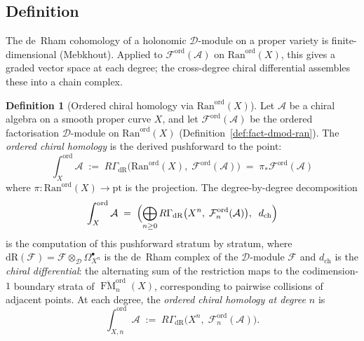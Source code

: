 \documentclass[11pt,reqno]{amsart}
\theoremstyle{definition}
\newtheorem{definition}[theorem]{Definition}
\theoremstyle{remark}
\newcommand{\cA}{\mathcal{A}}
\newcommand{\cD}{\mathcal{D}}
\newcommand{\cF}{\mathcal{F}}
\newcommand{\Ran}{\mathrm{Ran}}
\DeclareMathOperator{\FM}{FM}
\numberwithin{equation}{section}
\begin{document}
\subsection{Definition}
\label{subsec:ord-ch-def}

The de~Rham cohomology of a holonomic $\cD$-module on a
proper variety is finite-dimensional (Mebkhout).
Applied to $\cF^{\mathrm{ord}}(\cA)$ on
$\Ran^{\mathrm{ord}}(X)$, this gives a graded vector space
at each degree; the cross-degree chiral differential
assembles these into a chain complex.

\begin{definition}[Ordered chiral homology via
$\Ran^{\mathrm{ord}}(X)$]
\label{def:ord-ch-hom}
Let $\cA$ be a chiral algebra on a smooth proper curve $X$,
and let $\cF^{\mathrm{ord}}(\cA)$ be the ordered
factorisation $\cD$-module on $\Ran^{\mathrm{ord}}(X)$
(Definition~\ref{def:fact-dmod-ran}).
The \emph{ordered chiral homology} is the derived
pushforward to the point:
\begin{equation}\label{eq:ord-ch-hom-ran}
  \int_X^{\mathrm{ord}} \cA
  \;:=\;
  R\Gamma_{\mathrm{dR}}\bigl(
  \Ran^{\mathrm{ord}}(X),\;
  \cF^{\mathrm{ord}}(\cA)\bigr)
  \;=\;
  \pi_* \cF^{\mathrm{ord}}(\cA)
\end{equation}
where $\pi \colon \Ran^{\mathrm{ord}}(X) \to \mathrm{pt}$
is the projection. The degree-by-degree decomposition
\begin{equation}\label{eq:ord-ch-hom-def}
  \int_X^{\mathrm{ord}} \cA
  \;=\;
  \Bigl(
  \bigoplus_{n \geq 0}
  R\Gamma_{\mathrm{dR}}\bigl(X^n,\;
  \cF_n^{\mathrm{ord}}(\cA)\bigr),
  \;\; d_{\mathrm{ch}}
  \Bigr)
\end{equation}
is the computation of this pushforward stratum by stratum,
where $\mathrm{dR}(\cF) = \cF \otimes_{\cD}
\Omega^{\bullet}_{X^n}$ is the de~Rham complex of the
$\cD$-module $\cF$ and $d_{\mathrm{ch}}$ is the
\emph{chiral differential}: the alternating sum of the
restriction maps to the codimension-$1$ boundary strata of
$\overline{\FM}_n^{\mathrm{ord}}(X)$, corresponding to
pairwise collisions of adjacent points. At each
degree, the \emph{ordered chiral homology at degree $n$} is
\begin{equation}\label{eq:total-ord-ch}
  \int_{X,n}^{\mathrm{ord}} \cA
  \;:=\;
  R\Gamma_{\mathrm{dR}}\bigl(X^n,\;
  \cF_n^{\mathrm{ord}}(\cA)\bigr).
\end{equation}
\end{definition}

\end{document}
